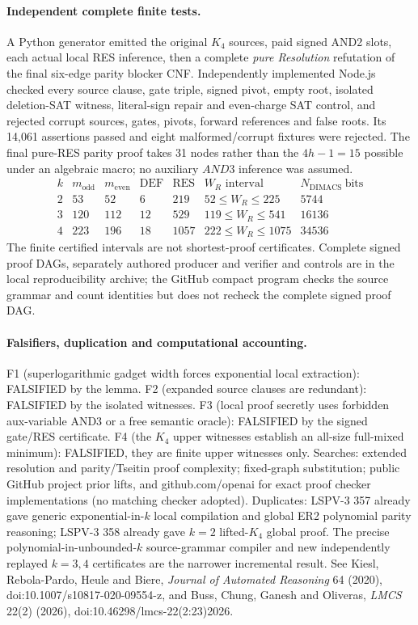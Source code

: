 \documentclass[11pt]{article}
\begin{document}
\paragraph{Independent complete finite tests.}
A Python generator emitted the original $K_4$ sources, paid signed AND2 slots, each actual local RES inference, then a complete \emph{pure Resolution} refutation of the final six-edge parity blocker CNF. Independently implemented Node.js checked every source clause, gate triple, signed pivot, empty root, isolated deletion-SAT witness, literal-sign repair and even-charge SAT control, and rejected corrupt sources, gates, pivots, forward references and false roots. Its 14,061 assertions passed and eight malformed/corrupt fixtures were rejected. The final pure-RES parity proof takes 31 nodes rather than the $4h-1=15$ possible under an algebraic macro; no auxiliary $AND3$ inference was assumed.
\[
\begin{array}{c|r|r|r|r|r|r}
k&m_{\mathrm{odd}}&m_{\mathrm{even}}&\mathrm{DEF}&\mathrm{RES}&W_R\text{ interval}&N_{\mathrm{DIMACS}}\mathrm{\ bits}\\\hline
2&53&52&6&219&52\le W_R\le225&5744\\
3&120&112&12&529&119\le W_R\le541&16136\\
4&223&196&18&1057&222\le W_R\le1075&34536
\end{array}
\]
The finite certified intervals are not shortest-proof certificates. Complete signed proof DAGs, separately authored producer and verifier and controls are in the local reproducibility archive; the GitHub compact program checks the source grammar and count identities but does not recheck the complete signed proof DAG.

\paragraph{Falsifiers, duplication and computational accounting.}
F1 (superlogarithmic gadget width forces exponential local extraction): FALSIFIED by the lemma. F2 (expanded source clauses are redundant): FALSIFIED by the isolated witnesses. F3 (local proof secretly uses forbidden aux-variable AND3 or a free semantic oracle): FALSIFIED by the signed gate/RES certificate. F4 (the $K_4$ upper witnesses establish an all-size full-mixed minimum): FALSIFIED, they are finite upper witnesses only. Searches: extended resolution and parity/Tseitin proof complexity; fixed-graph substitution; public GitHub project prior lifts, and github.com/openai for exact proof checker implementations (no matching checker adopted). Duplicates: LSPV-3 357 already gave generic exponential-in-$k$ local compilation and global ER2 polynomial parity reasoning; LSPV-3 358 already gave $k=2$ lifted-$K_4$ global proof. The precise polynomial-in-unbounded-$k$ source-grammar compiler and new independently replayed $k=3,4$ certificates are the narrower incremental result. See Kiesl, Rebola-Pardo, Heule and Biere, \emph{Journal of Automated Reasoning} 64 (2020), doi:10.1007/s10817-020-09554-z, and Buss, Chung, Ganesh and Oliveras, \emph{LMCS} 22(2) (2026), doi:10.46298/lmcs-22(2:23)2026.
\end{document}
